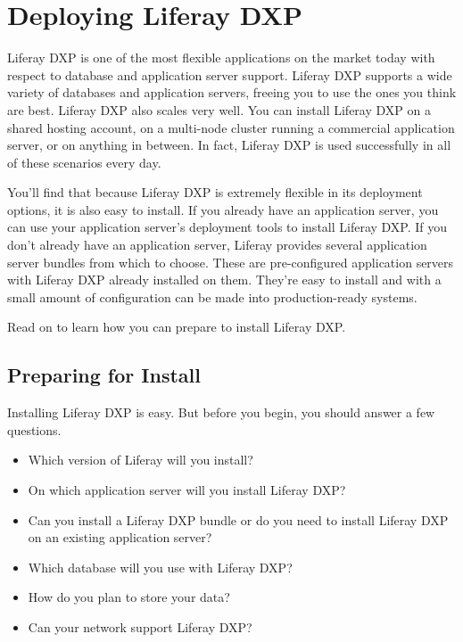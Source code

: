 \chapter{Deploying Liferay DXP}\label{deploying-liferay-dxp}

Liferay DXP is one of the most flexible applications on the market today
with respect to database and application server support. Liferay DXP
supports a wide variety of databases and application servers, freeing
you to use the ones you think are best. Liferay DXP also scales very
well. You can install Liferay DXP on a shared hosting account, on a
multi-node cluster running a commercial application server, or on
anything in between. In fact, Liferay DXP is used successfully in all of
these scenarios every day.

You'll find that because Liferay DXP is extremely flexible in its
deployment options, it is also easy to install. If you already have an
application server, you can use your application server's deployment
tools to install Liferay DXP. If you don't already have an application
server, Liferay provides several application server bundles from which
to choose. These are pre-configured application servers with Liferay DXP
already installed on them. They're easy to install and with a small
amount of configuration can be made into production-ready systems.

Read on to learn how you can prepare to install Liferay DXP.

\section{Preparing for Install}\label{preparing-for-install}

Installing Liferay DXP is easy. But before you begin, you should answer
a few questions.

\begin{itemize}
\tightlist
\item
  Which version of Liferay will you install?
\item
  On which application server will you install Liferay DXP?
\item
  Can you install a Liferay DXP bundle or do you need to install Liferay
  DXP on an existing application server?
\item
  Which database will you use with Liferay DXP?
\item
  How do you plan to store your data?
\item
  Can your network support Liferay DXP?
\end{itemize}

